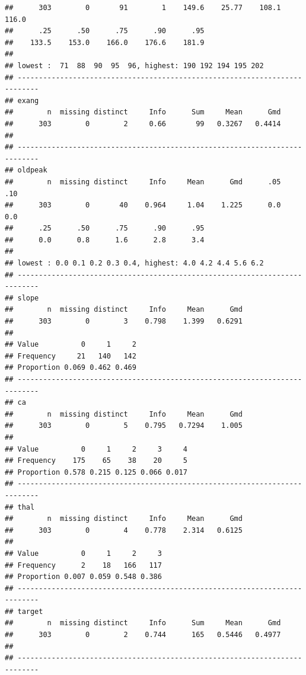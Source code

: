 \documentclass[]{article}
\begin{document}
\begin{verbatim}
##      303        0       91        1    149.6    25.77    108.1    116.0 
##      .25      .50      .75      .90      .95 
##    133.5    153.0    166.0    176.6    181.9 
## 
## lowest :  71  88  90  95  96, highest: 190 192 194 195 202
## ---------------------------------------------------------------------------
## exang 
##        n  missing distinct     Info      Sum     Mean      Gmd 
##      303        0        2     0.66       99   0.3267   0.4414 
## 
## ---------------------------------------------------------------------------
## oldpeak 
##        n  missing distinct     Info     Mean      Gmd      .05      .10 
##      303        0       40    0.964     1.04    1.225      0.0      0.0 
##      .25      .50      .75      .90      .95 
##      0.0      0.8      1.6      2.8      3.4 
## 
## lowest : 0.0 0.1 0.2 0.3 0.4, highest: 4.0 4.2 4.4 5.6 6.2
## ---------------------------------------------------------------------------
## slope 
##        n  missing distinct     Info     Mean      Gmd 
##      303        0        3    0.798    1.399   0.6291 
##                             
## Value          0     1     2
## Frequency     21   140   142
## Proportion 0.069 0.462 0.469
## ---------------------------------------------------------------------------
## ca 
##        n  missing distinct     Info     Mean      Gmd 
##      303        0        5    0.795   0.7294    1.005 
##                                         
## Value          0     1     2     3     4
## Frequency    175    65    38    20     5
## Proportion 0.578 0.215 0.125 0.066 0.017
## ---------------------------------------------------------------------------
## thal 
##        n  missing distinct     Info     Mean      Gmd 
##      303        0        4    0.778    2.314   0.6125 
##                                   
## Value          0     1     2     3
## Frequency      2    18   166   117
## Proportion 0.007 0.059 0.548 0.386
## ---------------------------------------------------------------------------
## target 
##        n  missing distinct     Info      Sum     Mean      Gmd 
##      303        0        2    0.744      165   0.5446   0.4977 
## 
## ---------------------------------------------------------------------------
\end{verbatim}
\end{document}
